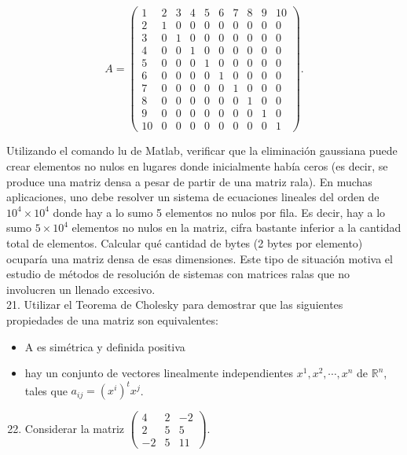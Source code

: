 \documentclass[10pt]{book}
\begin{document}
$$
A=\left(\begin{array}{rrrrrrrrrr}
1 & 2 & 3 & 4 & 5 & 6 & 7 & 8 & 9 & 10 \\
2 & 1 & 0 & 0 & 0 & 0 & 0 & 0 & 0 & 0 \\
3 & 0 & 1 & 0 & 0 & 0 & 0 & 0 & 0 & 0 \\
4 & 0 & 0 & 1 & 0 & 0 & 0 & 0 & 0 & 0 \\
5 & 0 & 0 & 0 & 1 & 0 & 0 & 0 & 0 & 0 \\
6 & 0 & 0 & 0 & 0 & 1 & 0 & 0 & 0 & 0 \\
7 & 0 & 0 & 0 & 0 & 0 & 1 & 0 & 0 & 0 \\
8 & 0 & 0 & 0 & 0 & 0 & 0 & 1 & 0 & 0 \\
9 & 0 & 0 & 0 & 0 & 0 & 0 & 0 & 1 & 0 \\
10 & 0 & 0 & 0 & 0 & 0 & 0 & 0 & 0 & 1
\end{array}\right) .
$$

Utilizando el comando lu de Matlab, verificar que la eliminación gaussiana puede crear elementos no nulos en lugares donde inicialmente había ceros (es decir, se produce una matriz densa a pesar de partir de una matriz rala). En muchas aplicaciones, uno debe resolver un sistema de ecuaciones lineales del orden de $10^{4} \times 10^{4}$ donde hay a lo sumo 5 elementos no nulos por fila. Es decir, hay a lo sumo $5 \times 10^{4}$ elementos no nulos en la matriz, cifra bastante inferior a la cantidad total de elementos. Calcular qué cantidad de bytes (2 bytes por elemento) ocuparía una matriz densa de esas dimensiones. Este tipo de situación motiva el estudio de métodos de resolución de sistemas con matrices ralas que no involucren un llenado excesivo.\\
21. Utilizar el Teorema de Cholesky para demostrar que las siguientes propiedades de una matriz son equivalentes:

\begin{itemize}
  \item A es simétrica y definida positiva
  \item hay un conjunto de vectores linealmente independientes $x^{1}, x^{2}, \cdots, x^{n}$ de $\mathbb{R}^{n}$, tales que $a_{i j}=\left(x^{i}\right)^{t} x^{j}$.
\end{itemize}

\begin{enumerate}
  \setcounter{enumi}{21}
  \item Considerar la matriz $\left(\begin{array}{ccc}4 & 2 & -2 \\ 2 & 5 & 5 \\ -2 & 5 & 11\end{array}\right)$.
\end{enumerate}
\end{document}

